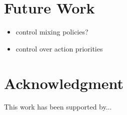 \documentclass[a4paper, 10pt, conference]{ieeeconf}      %
\begin{document}
\section{Future Work}

\begin{itemize}
    \item control mixing policies?
    \item control over action priorities
\end{itemize}

\section*{Acknowledgment}

This work has been supported by...



\end{document}
